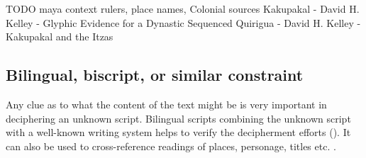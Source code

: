 \documentclass[../main.tex]{subfiles}
\begin{document}
TODO maya context
rulers, place names, Colonial sources
Kakupakal
    - David H. Kelley - Glyphic Evidence for a Dynastic Sequenced Quirigua
    - David H. Kelley - Kakupakal and the Itzas

\subsection{Bilingual, biscript, or similar constraint}
Any clue as to what the content of the text might be is very important in deciphering an 
unknown script.
Bilingual scripts combining the unknown script with a well-known writing system helps to
verify the decipherment efforts (\cite[44]{coe1992}).
It can also be used to cross-reference readings of places, personage, titles etc. 
.
\end{document}
